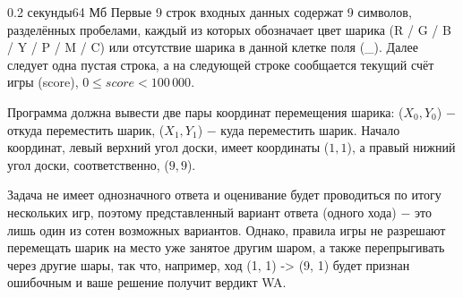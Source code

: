 \begin{problem}{}{}{}{0.2 секунды}{64 Мб}
\InputFile
Первые 9 строк входных данных содержат 9 символов, разделённых пробелами, каждый из которых обозначает 
цвет шарика (R / G / B / Y / P / M / C) или отсутствие шарика в данной клетке поля (\_). 
Далее следует одна пустая строка, а на следующей строке сообщается текущий счёт игры (score), $0 \le score < 100\,000$.

\OutputFile
Программа должна вывести две пары координат перемещения шарика: ($X_0, Y_0$) $-$ откуда переместить шарик, 
($X_1, Y_1$) $-$ куда переместить шарик. Начало координат, левый верхний угол доски, имеет координаты ($1, 1$), 
а правый нижний угол доски, соответственно,  ($9, 9$).

\Example

\begin{example}
%
\end{example}

\Note
Задача не имеет однозначного ответа и оценивание будет проводиться по итогу нескольких игр, 
поэтому представленный вариант ответа (одного хода) $-$ это лишь один из сотен возможных вариантов. 
Однако, правила игры не разрешают перемещать шарик на место уже занятое другим шаром, 
а также перепрыгивать через другие шары, так что, например, ход (1, 1) -> (9, 1) будет признан ошибочным 
и ваше решение получит вердикт WA.

\end{problem}

